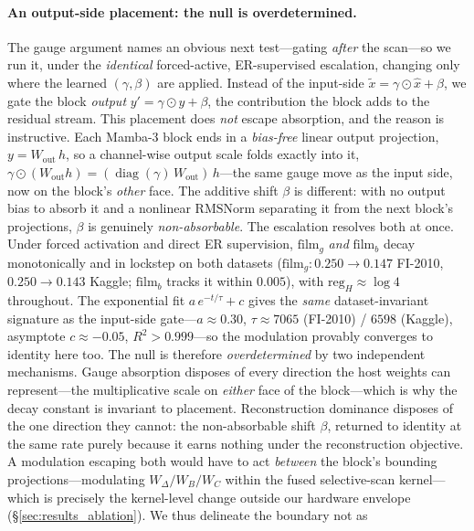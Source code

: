 \documentclass{article}
\DeclareMathOperator{\diag}{diag}
\begin{document}
\paragraph{An output-side placement: the null is overdetermined.}
The gauge argument names an obvious next test---gating \emph{after} the
scan---so we run it, under the \emph{identical} forced-active, ER-supervised
escalation, changing only where the learned $(\gamma,\beta)$ are applied.
Instead of the input-side $\tilde{x} = \gamma \odot \hat{x} + \beta$, we gate
the block \emph{output} $y' = \gamma \odot y + \beta$, the contribution the
block adds to the residual stream.  This placement does \emph{not} escape
absorption, and the reason is instructive.  Each Mamba-3 block ends in a
\emph{bias-free} linear output projection, $y = W_{\text{out}}\,h$, so a
channel-wise output scale folds exactly into it,
$\gamma \odot (W_{\text{out}} h) = (\diag(\gamma)\,W_{\text{out}})\,h$---the
same gauge move as the input side, now on the block's \emph{other} face.  The
additive shift $\beta$ is different: with no output bias to absorb it and a
nonlinear $\mathrm{RMSNorm}$ separating it from the next block's projections,
$\beta$ is genuinely \emph{non-absorbable}.  The escalation resolves both at
once.  Under forced activation and direct ER supervision, $\mathrm{film}_g$
\emph{and} $\mathrm{film}_b$ decay monotonically and in lockstep on both
datasets ($\mathrm{film}_g: 0.250 \!\to\! 0.147$ FI-2010, $0.250 \!\to\! 0.143$
Kaggle; $\mathrm{film}_b$ tracks it within $0.005$), with
$\mathrm{reg}_H \approx \log 4$ throughout.  The exponential fit
$a\,e^{-t/\tau}+c$ gives the \emph{same} dataset-invariant signature as the
input-side gate---$a \approx 0.30$, $\tau \approx 7065$ (FI-2010) / $6598$
(Kaggle), asymptote $c \approx -0.05$, $R^2 > 0.999$---so the modulation
provably converges to identity here too.  The null is therefore
\emph{overdetermined} by two independent mechanisms.  Gauge absorption disposes
of every direction the host weights can represent---the multiplicative scale on
\emph{either} face of the block---which is why the decay constant is invariant
to placement.  Reconstruction dominance disposes of the one direction they
cannot: the non-absorbable shift $\beta$, returned to identity at the same rate
purely because it earns nothing under the reconstruction objective.  A
modulation escaping both would have to act \emph{between} the block's bounding
projections---modulating $W_\Delta/W_B/W_C$ within the fused selective-scan
kernel---which is precisely the kernel-level change outside our hardware
envelope (\S\ref{sec:results_ablation}).  We thus delineate the boundary not as
\end{document}
